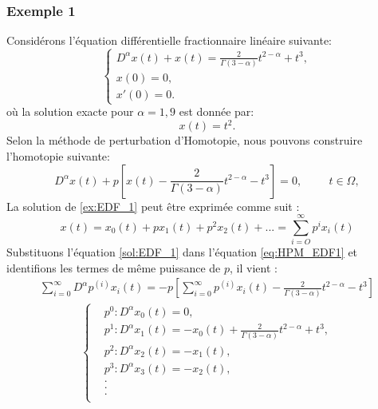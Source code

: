 \subsubsection*{Exemple 1}
Considérons l'équation différentielle fractionnaire linéaire suivante:
\begin{equation}
    \begin{cases}\label{ex:EDF_1}
        D^{\alpha}x(t) + x(t) = \frac{2}{\Gamma(3-\alpha)} t^{2-\alpha} + t^3,\\
        x(0)=0,\\
        x'(0)=0.
    \end{cases}
\end{equation}
où la solution exacte pour $\alpha = 1,9$ est donnée par:
\begin{equation}
    x(t)=t^2.
\end{equation}
Selon la méthode de perturbation d'Homotopie, nous pouvons construire l'homotopie suivante:
\begin{equation} \label{eq:HPM_EDF1}
    D^{\alpha} x(t) +p\left[x(t)-\frac{2}{\Gamma(3-\alpha)}t^{2-\alpha}-t^3\right] =0, \hspace{1cm} t\in \Omega,
\end{equation}
La solution de \ref{ex:EDF_1} peut être exprimée comme suit :
\begin{equation}\label{sol:EDF_1}
    x(t) =x_0(t) + px_1(t) + p^2x_2(t) + ... = \sum _{i=O}^{\infty} p^i x_i(t)
\end{equation}
Substituons l'équation \ref{sol:EDF_1} dans l'équation \ref{eq:HPM_EDF1} et identifions les termes de même puissance de $p$, il vient :
\begin{align*}
    \sum_{i=0}^{\infty} D^{\alpha} p^{(i)} x_i(t) = -p\left[\sum_{i=0}^{\infty} p^{(i)} x_i(t) -\frac{2}{\Gamma(3-\alpha)} t^{2-\alpha} -t^3\right]
\end{align*}
\begin{align} \label{eq:p_1}
    \begin{cases}
    & p^0 : D^{\alpha}x_0(t)=0, \\
    & p^1 : D^{\alpha}x_1(t) = -x_0(t) + \frac{2}{\Gamma(3-\alpha)} t^{2-\alpha} + t^3,\\
    & p^2 : D^{\alpha} x_2(t) = -x_1(t),\\
    & p^3 : D^{\alpha} x_3(t) = -x_2(t),\\
    &     . \\
    &     .\\
    &     .\\
    \end{cases}
\end{align}
